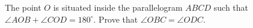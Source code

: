 The point $O$ is situated inside the parallelogram $ABCD$ such that $\angle AOB+\angle COD=180^{\circ}$. Prove that $\angle OBC=\angle ODC$.